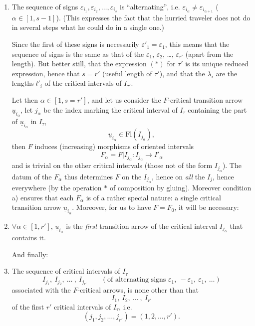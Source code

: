\documentclass[11pt]{article}
\newcommand{\printedpage}[1]{\marginpar{\footnotesize p.~#1}}
\newcommand{\msp}[1]{\marginpar{\footnotesize [#1]}}
\newcommand{\ul}[1]{\underline{#1}}
\begin{document}
\begin{enumerate}[label={}, leftmargin=*]
\item[a)] The sequence of signs $\varepsilon_{i_1},\varepsilon_{i_2},\dots,\varepsilon_{i_s}$ is ``alternating'', i.e. $\varepsilon_{i_\alpha}\neq\varepsilon_{i_{\alpha+1}}$ ($\alpha\in[1,s-1]$). (This expresses the fact that the hurried traveler does not do in several steps what he could do in a single one.)

Since the first of these signs is necessarily $\varepsilon'_1=\varepsilon_1$, this means that the sequence of signs is the same as that of the $\varepsilon_1$, $\varepsilon_2$, \dots, $\varepsilon_{r'}$ (apart from the length). But better still, that the expression $(*)$ for $\tau'$ is its unique reduced expression, hence that $s=r'$ (useful length of $\tau'$), and that the $\lambda_i$ are the lengths $l'_i$ of the critical intervals of $I_{\tau'}$.

\printedpage{57}

\msp{page 88}
Let then $\alpha\in[1,s=r']$, and let us consider the $F$-critical transition arrow $\ul{u}_{i_\alpha}$, let $j_\alpha$ be the index marking the critical interval of $I_\tau$ containing the part of $\ul{u}_{i_\alpha}$ in $I_\tau$,
\[
\ul{u}_{i_\alpha}\in\mathrm{Fl}(I_{j_\alpha}),
\]
then $F$ induces (increasing) morphisms of oriented intervals
\[
F_\alpha=F|I_{j_\alpha}:I_{j_\alpha}\longrightarrow I'_\alpha
\]
and is trivial on the other critical intervals (those not of the form $I_{j_\alpha}$). The datum of the $F_\alpha$ thus determines $F$ on the $I_{j_\alpha}$, hence on \textit{all} the $I_j$, hence everywhere (by the operation $*$ of composition by gluing). Moreover condition a) ensures that each $F_\alpha$ is of a rather special nature: a single critical transition arrow $\ul{u}_{i_\alpha}$. Moreover, for us to have $F=F_0$, it will be necessary:

\item[b)] $\forall\alpha\in[1,r']$, $\ul{u}_{i_\alpha}$ is the \textit{first} transition arrow of the critical interval $I_{j_\alpha}$ that contains it.

And finally:

\item[c)] The sequence of critical intervals of $I_\tau$
\[
I_{j_1},\ I_{j_2},\ \dots\ ,\ I_{j_{r'}}\qquad(\text{of alternating signs }\varepsilon_1,\ -\varepsilon_1,\ \varepsilon_1,\ \ldots)
\]
associated with the $F$-critical arrows, is none other than that
\[
I_1,\ I_2,\ \dots\ ,\ I_{r'}
\]
of the first $r'$ critical intervals of $I_\tau$, i.e.
\[
(j_1,j_2,\dots,j_{r'})=(1,2,\dots,r').
\]
\end{enumerate}
\end{document}
